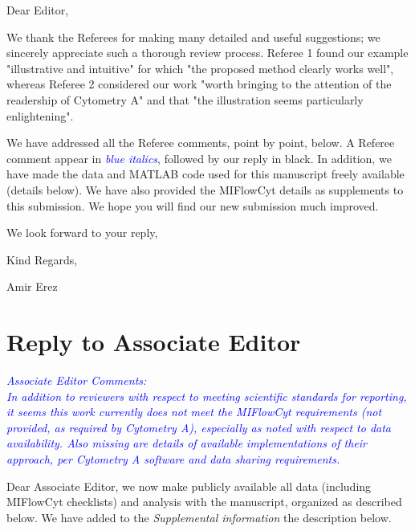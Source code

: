 \documentclass[letter,11pt,draft]{article}
\newcommand{\re}[1]{\emph{\textcolor{blue}{#1}}}
\begin{document}




Dear Editor,

\bigskip

We thank the Referees for making many detailed and useful suggestions; we sincerely appreciate such a thorough review process.
Referee 1 found our example "illustrative and intuitive" for which "the proposed method clearly works well", whereas Referee 2 considered our work "worth bringing to the attention of the readership of Cytometry A" and that "the illustration seems particularly enlightening".

\bigskip
We have addressed all the Referee comments, point by point, below. A Referee comment appear in \re{blue italics}, followed by our reply in black. In addition, we have made the data and MATLAB code used for this manuscript freely available (details below). We have also provided the MIFlowCyt details as supplements to this submission. We hope you will find our new submission much improved.

\bigskip
\bigskip
\bigskip
We look forward to your reply,

\bigskip
Kind Regards,

\bigskip
\bigskip
\bigskip
Amir Erez

\newpage
\section*{Reply to Associate Editor}

\re{
Associate Editor Comments:
\\
In addition to reviewers with respect to meeting scientific standards for reporting, it seems this work currently does not meet the MIFlowCyt requirements (not provided, as required by Cytometry A), especially as noted  with respect to data availability. Also missing are details of available implementations of their approach, per  Cytometry A software and data sharing requirements.}

\smallskip
Dear Associate Editor, we now make publicly available all data (including MIFlowCyt checklists) and analysis with the manuscript, organized as described below. We have added to the \emph{Supplemental information} the description below.
\end{document}
